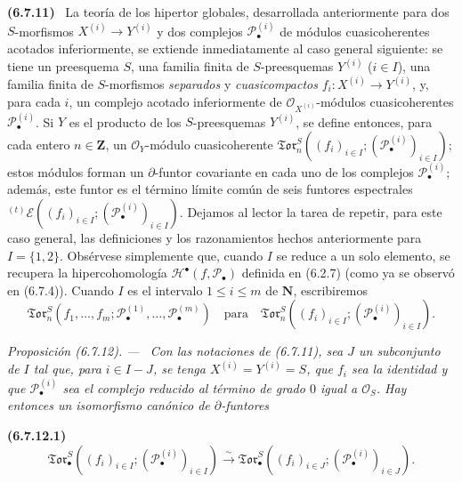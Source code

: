 \documentclass[10pt,oneside]{book}
\newenvironment{env}[1][]{\par\medskip\noindent\textbf{(#1)}\ }{\par}
\newenvironment{proposition}[1][]{\par\medskip\noindent\itshape Proposición (#1). ---\ }{\par}
\providecommand{\setmin}{-}%
\begin{document}
\begin{env}[6.7.11]
\label{III.6.7.11}
La teoría de los hipertor globales, desarrollada anteriormente para dos
$S$-morfismos $X^{(i)}\to Y^{(i)}$ y dos complejos
$\mathscr P_\bullet^{(i)}$ de módulos cuasicoherentes acotados inferiormente,
se extiende inmediatamente al caso general siguiente: se tiene un preesquema
$S$, una familia finita de $S$-preesquemas $Y^{(i)}$ ($i\in I$), una familia
finita de $S$-morfismos \emph{separados} y \emph{cuasicompactos}
$f_i:X^{(i)}\to Y^{(i)}$, y, para cada $i$, un complejo acotado inferiormente
de $\mathscr O_{X^{(i)}}$-módulos cuasicoherentes
$\mathscr P_\bullet^{(i)}$. Si $Y$ es el producto de los $S$-preesquemas
$Y^{(i)}$, se define entonces, para cada entero $n\in\mathbf Z$, un
$\mathscr O_Y$-módulo cuasicoherente
$\mathfrak{Tor}_n^S((f_i)_{i\in I};
(\mathscr P_\bullet^{(i)})_{i\in I})$;
estos módulos forman un $\partial$-funtor covariante en cada uno de los
complejos $\mathscr P_\bullet^{(i)}$; además, este funtor es el término límite
común de seis funtores espectrales
${}^{(t)}\mathscr E((f_i)_{i\in I};(\mathscr P_\bullet^{(i)})_{i\in I})$.
Dejamos al lector la tarea de repetir, para este caso general, las definiciones
y los razonamientos hechos anteriormente para $I=\{1,2\}$. Obsérvese
simplemente que, cuando $I$ se reduce a un solo elemento, se recupera la
hipercohomología $\mathscr H^\bullet(f,\mathscr P_\bullet)$ definida en
(6.2.7) (como ya se observó en (6.7.4)). Cuando $I$ es el intervalo
$1\leq i\leq m$ de $\mathbf N$, escribiremos
\label{III.6.7.11.2}
\[
  \mathfrak{Tor}_n^S
  (f_1,\ldots,f_m;
   \mathscr P_\bullet^{(1)},\ldots,\mathscr P_\bullet^{(m)})
  \quad\text{para}\quad
  \mathfrak{Tor}_n^S
  ((f_i)_{i\in I};(\mathscr P_\bullet^{(i)})_{i\in I}).
\]
\end{env}

\begin{proposition}[6.7.12]
\label{III.6.7.12}
Con las notaciones de (6.7.11), sea $J$ un subconjunto de $I$ tal que, para
$i\in I\setmin J$, se tenga $X^{(i)}=Y^{(i)}=S$, que $f_i$ sea la identidad y que
$\mathscr P_\bullet^{(i)}$ sea el complejo reducido al término de grado $0$
igual a $\mathscr O_S$. Hay entonces un isomorfismo canónico de
$\partial$-funtores
\begin{env}[6.7.12.1]
\label{III.6.7.12.1}
\[
  \mathfrak{Tor}_\bullet^S
  ((f_i)_{i\in I};(\mathscr P_\bullet^{(i)})_{i\in I})
  \xrightarrow{\sim}
  \mathfrak{Tor}_\bullet^S
  ((f_i)_{i\in J};(\mathscr P_\bullet^{(i)})_{i\in J}).
  \tag{6.7.12.1}\label{III.6.7.12.1.eq}
\]
\end{env}
\end{proposition}
\end{document}
